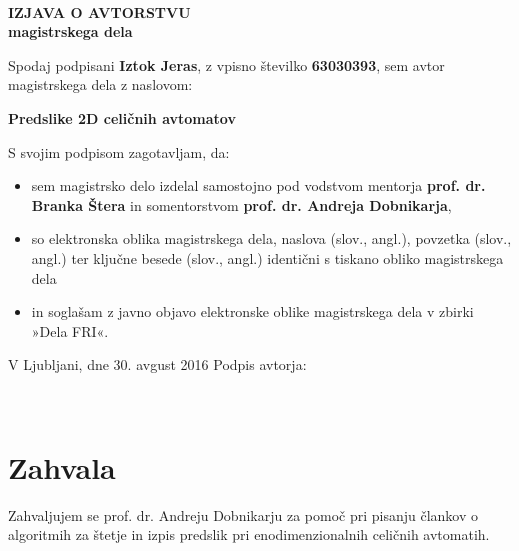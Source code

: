 \documentclass[12pt,a4paper,openany,twoside]{book}
\begin{document}
\ \thispagestyle{empty}
\newpage


\thispagestyle{empty}

\vspace*{2cm}
\begin{center}
{\Large \textbf{IZJAVA O AVTORSTVU \\ \vspace{0.5cm} magistrskega dela}}
\end{center}
\vspace{1cm}

Spodaj podpisani \textbf{Iztok Jeras},
z vpisno številko \textbf{63030393},
sem avtor magistrskega dela z naslovom:

\vspace{1cm}
\hspace{1cm}\textbf{Predslike 2D celičnih avtomatov}
\vspace{1cm}

S svojim podpisom zagotavljam, da:
\begin{itemize}
\item sem magistrsko delo izdelal samostojno pod vodstvom mentorja \textbf{prof. dr. Branka Štera} in somentorstvom \textbf{prof. dr. Andreja Dobnikarja},
\item so elektronska oblika magistrskega dela, naslova (slov., angl.), povzetka (slov., angl.) ter ključne besede (slov., angl.) identični s tiskano obliko magistrskega dela
\item in soglašam z javno objavo elektronske oblike magistrskega dela v zbirki »Dela FRI«.
\end{itemize}

\vspace{3cm}
V Ljubljani, dne 30. avgust 2016 \hfill Podpis avtorja:
\newpage 

\ \thispagestyle{empty}
\newpage


\chapter*{Zahvala}
\thispagestyle{empty}
Zahvaljujem se prof. dr. Andreju Dobnikarju za pomoč pri pisanju člankov
o algoritmih za štetje in izpis predslik pri enodimenzionalnih celičnih avtomatih.
\newpage
\end{document}
